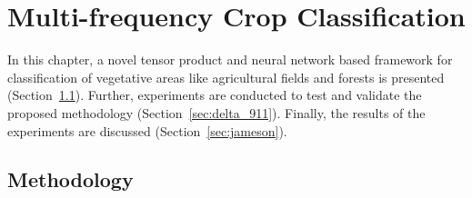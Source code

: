 \chapter{Multi-frequency Crop Classification}

In this chapter, a novel tensor product and neural network based framework for classification of vegetative areas like agricultural fields and forests is presented (Section~\ref{sec:sfo_ba33}). Further, experiments are conducted to test and validate the proposed methodology (Section~\ref{sec:delta_911}). Finally, the results of the experiments are discussed (Section~\ref{sec:jameson}). 

\section{Methodology} 
\label{sec:sfo_ba33}


